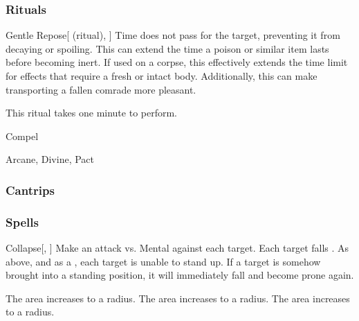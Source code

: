 \subsubsection{Rituals}


\lowercase{\hypertarget{spell:Gentle Repose}{}}\label{spell:Gentle Repose}
\begin{attuneability}[Rank 3]{\hypertarget{spell:Gentle Repose}{Gentle Repose}}[ (ritual), ]
Time does not pass for the target, preventing it from decaying or spoiling.
This can extend the time a poison or similar item lasts before becoming inert.
If used on a corpse, this effectively extends the time limit for effects that require a fresh or intact body.
Additionally, this can make transporting a fallen comrade more pleasant.


This ritual takes one minute to perform.
\end{attuneability}
\vspace{0.25em}


\newpage
\begin{spellsection}{Compel}

\begin{spellheader}
\end{spellheader}


 Arcane, Divine, Pact

\subsubsection{Cantrips}


\end{spellsection}


\subsubsection{Spells}


\lowercase{\hypertarget{spell:Collapse}{}}\label{spell:Collapse}
\begin{freeability}[Rank 1]{\hypertarget{spell:Collapse}{Collapse}}[, ]
Make an attack vs. Mental against each target.
\hit Each target falls .
\crit As above, and as a , each target is unable to stand up.
If a target is somehow brought into a standing position, it will immediately fall and become prone again.

\rankline
{} The area increases to a \arealarge radius.
 The area increases to a \areahuge radius.
 The area increases to a \areaext radius.
\end{freeability}
\vspace{0.25em}



